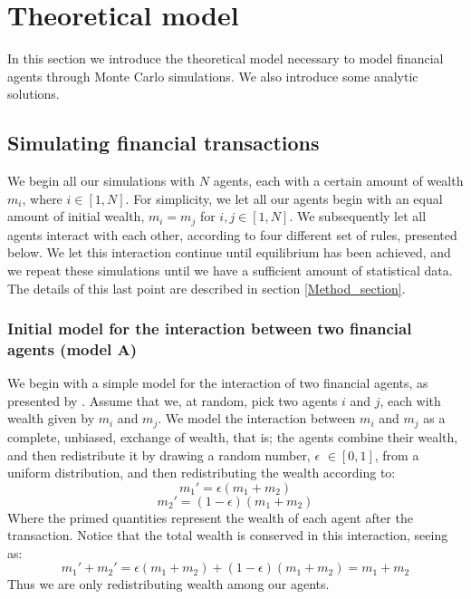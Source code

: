 \documentclass[a4paper, 10pt]{article}
\begin{document}
\section{Theoretical model}
In this section we introduce the theoretical model necessary to model financial agents through Monte Carlo simulations. We also introduce some analytic solutions. 
\subsection{Simulating financial transactions}
We begin all our simulations with $N$ agents, each with a certain amount of wealth $m_i$, where $i \in [1, N]$.  For simplicity, we let all our agents begin with an equal amount of initial wealth, $m_i=m_j$ for $i,j \in [1,N]$. We subsequently let all agents interact with each other, according to four different set of rules, presented below. We let this interaction continue until equilibrium has been achieved, and we repeat these simulations until we have a sufficient amount of statistical data. The details of this last point are described in section \ref{Method_section}.
\subsubsection{Initial model for the interaction between two financial agents (model A)}\label{Initial_model}
We begin with a simple model for the interaction of two financial agents, as presented by \cite{Gibbs}. Assume that we, at random, pick two agents $i$ and $j$, each with wealth given by $m_i$ and $m_j$. We model the interaction between $m_i$ and $m_j$ as a complete, unbiased, exchange of wealth, that is; the agents combine their wealth, and then redistribute it by drawing a random number, $\epsilon$ $\in [0,1]$, from a uniform distribution, and then redistributing the wealth according to:
\begin{equation}
m_1'=\epsilon(m_1+m_2)
\end{equation}
\begin{equation}
m_2'=(1-\epsilon)(m_1+m_2)
\end{equation}
Where the primed quantities represent the wealth of each agent after the transaction. Notice that the total wealth is conserved in this interaction, seeing as:
$$m_1'+m_2'=\epsilon(m_1+m_2)+(1-\epsilon)(m_1+m_2)=m_1+m_2$$
Thus we are only redistributing wealth among our agents.
\end{document}
